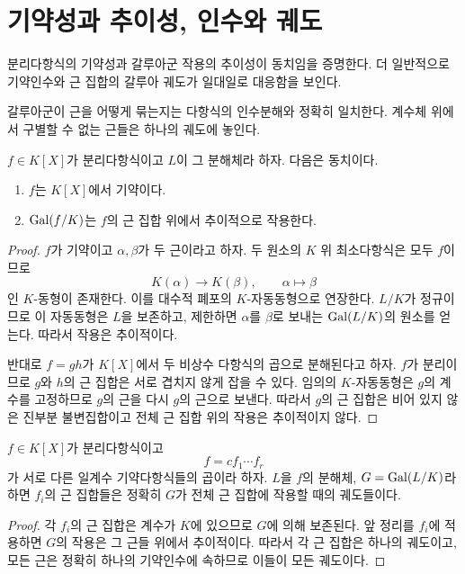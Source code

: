 \clearpage
\section{기약성과 추이성, 인수와 궤도}
\label{sec:irreducibility-transitivity}

\begin{learninggoal}
분리다항식의 기약성과 갈루아군 작용의 추이성이 동치임을 증명한다. 더 일반적으로 기약인수와 근 집합의 갈루아 궤도가 일대일로 대응함을 보인다.
\end{learninggoal}

갈루아군이 근을 어떻게 묶는지는 다항식의 인수분해와 정확히 일치한다. 계수체 위에서 구별할 수 없는 근들은 하나의 궤도에 놓인다.

\begin{theorem}
$f\in K[X]$가 분리다항식이고 $L$이 그 분해체라 하자. 다음은 동치이다.
\begin{enumerate}[label=(\roman*)]
  \item $f$는 $K[X]$에서 기약이다.
  \item $\operatorname{Gal}(f/K)$는 $f$의 근 집합 위에서 추이적으로 작용한다.
\end{enumerate}
\end{theorem}

\begin{proof}
$f$가 기약이고 $\alpha,\beta$가 두 근이라고 하자. 두 원소의 $K$ 위 최소다항식은 모두 $f$이므로
\[
  K(\alpha)\longrightarrow K(\beta),
  \qquad
  \alpha\longmapsto\beta
\]
인 $K$-동형이 존재한다. 이를 대수적 폐포의 $K$-자동동형으로 연장한다. $L/K$가 정규이므로 이 자동동형은 $L$을 보존하고, 제한하면 $\alpha$를 $\beta$로 보내는 $\operatorname{Gal}(L/K)$의 원소를 얻는다. 따라서 작용은 추이적이다.

반대로 $f=gh$가 $K[X]$에서 두 비상수 다항식의 곱으로 분해된다고 하자. $f$가 분리이므로 $g$와 $h$의 근 집합은 서로 겹치지 않게 잡을 수 있다. 임의의 $K$-자동동형은 $g$의 계수를 고정하므로 $g$의 근을 다시 $g$의 근으로 보낸다. 따라서 $g$의 근 집합은 비어 있지 않은 진부분 불변집합이고 전체 근 집합 위의 작용은 추이적이지 않다.
\end{proof}

\begin{theorem}
$f\in K[X]$가 분리다항식이고
\[
  f=c f_1\cdots f_r
\]
가 서로 다른 일계수 기약다항식들의 곱이라 하자. $L$을 $f$의 분해체, $G=\operatorname{Gal}(L/K)$라 하면 $f_i$의 근 집합들은 정확히 $G$가 전체 근 집합에 작용할 때의 궤도들이다.
\end{theorem}

\begin{proof}
각 $f_i$의 근 집합은 계수가 $K$에 있으므로 $G$에 의해 보존된다. 앞 정리를 $f_i$에 적용하면 $G$의 작용은 그 근들 위에서 추이적이다. 따라서 각 근 집합은 하나의 궤도이고, 모든 근은 정확히 하나의 기약인수에 속하므로 이들이 모든 궤도이다.
\end{proof}

